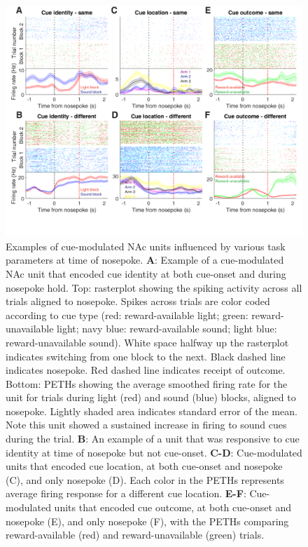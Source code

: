 \documentclass[11pt]{article}
\newcommand{\bsf}[1]{\textbf{#1}}
\begin{document}
 \begin{figure}[ht!]
\centering
\includegraphics[width=\textwidth]{Fig 9 - NP Neural examples.pdf}
\caption{Examples of cue-modulated NAc units influenced by various task
parameters at time of nosepoke. \bsf{A}: Example of a cue-modulated NAc unit
that encoded cue identity at both cue-onset and during nosepoke hold. Top:
rasterplot showing the spiking activity across all trials aligned to
nosepoke. Spikes across trials are color coded according to cue type (red:
reward-available light; green: reward-unavailable light; navy blue:
reward-available sound; light blue: reward-unavailable sound). White space
halfway up the rasterplot indicates switching from one block to the
next. Black dashed line indicates nosepoke. Red dashed line indicates receipt
of outcome. Bottom: PETHs showing the average smoothed firing rate for the
unit for trials during light (red) and sound (blue) blocks, aligned to
nosepoke. Lightly shaded area indicates standard error of the mean. Note this
unit showed a sustained increase in firing to sound cues during the trial. \bsf{B}: An
example of a unit that was responsive to cue identity at time of nosepoke but
not cue-onset. \bsf{C-D}: Cue-modulated units that encoded cue location, at
both cue-onset and nosepoke (C), and only nosepoke (D). Each color in the
PETHs represents average firing response for a different cue
location. \bsf{E-F}: Cue-modulated units that encoded cue outcome, at both
cue-onset and nosepoke (E), and only nosepoke (F), with the PETHs comparing
reward-available (red) and reward-unavailable (green) trials.}
\label{fig:NP_examples}
\end{figure} \clearpage
\end{document}
